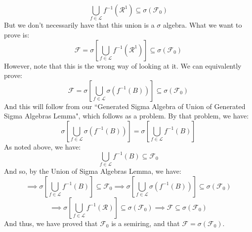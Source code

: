 \documentclass[12pt,a4paper]{article}
\newcommand{\1}[1]{\mathbbm{1}\left\{ #1 \right\}}
\newcommand{\lcal}{\mathcal{L}}
\newcommand{\fcal}{\mathcal{F}}
\newcommand{\rcal}{\mathcal{R}}
\begin{document}
\begin{enumerate}
	$$
		\bigcup_{f \in \lcal} f^{-1}(\rcal^1) \subseteq \sigma(\fcal_0)
	$$
	But we don't necessarily have that this union is a $\sigma$ algebra. What we want to prove is:
	$$
		\fcal = \sigma\left[\bigcup_{f \in \lcal} f^{-1}(\rcal^1)\right] \subseteq \sigma(\fcal_0)
	$$
	However, note that this is the wrong way of looking at it. We can equivalently prove:
	$$
		\fcal = \sigma\left[\bigcup_{f \in \lcal} \sigma(f^{-1}(B))\right] \subseteq \sigma(\fcal_0)
	$$
	And this will follow from our ``Generated Sigma Algebra of Union of Generated Sigma Algebras Lemma", which follows as a problem. By that problem, we have:
	$$
		\sigma\left[\bigcup_{f \in \lcal} \sigma(f^{-1}(B))\right] =
		\sigma\left[\bigcup_{f \in \lcal} f^{-1}(B)\right]
	$$
	As noted above, we have:
	$$
		\bigcup_{f \in \lcal} f^{-1}(B) \subseteq \fcal_0
	$$
	And so, by the Union of Sigma Algebras Lemma, we have:
	$$
		\implies
		\sigma\left[\bigcup_{f \in \lcal} f^{-1}(B)\right] \subseteq \fcal_0
		\implies
		\sigma\left[\bigcup_{f \in \lcal} \sigma(f^{-1}(B))\right] \subseteq \sigma(\fcal_0)
	$$
	$$
		\implies
		\sigma\left[\bigcup_{f \in \lcal} f^{-1}(\rcal)\right] \subseteq \sigma(\fcal_0)
		\implies
		\fcal \subseteq \sigma(\fcal_0)
	$$
	And thus, we have proved that $\fcal_0$ is a semiring, and that $\fcal = \sigma(\fcal_0)$.
	

\end{enumerate}
\end{document}
